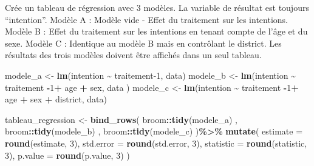 \documentclass[
]{article}
\newenvironment{Shaded}{\begin{snugshade}}{\end{snugshade}}
\newcommand{\AttributeTok}[1]{\textcolor[rgb]{0.13,0.29,0.53}{#1}}
\newcommand{\DecValTok}[1]{\textcolor[rgb]{0.00,0.00,0.81}{#1}}
\newcommand{\FunctionTok}[1]{\textcolor[rgb]{0.13,0.29,0.53}{\textbf{#1}}}
\newcommand{\NormalTok}[1]{#1}
\newcommand{\OtherTok}[1]{\textcolor[rgb]{0.56,0.35,0.01}{#1}}
\newcommand{\SpecialCharTok}[1]{\textcolor[rgb]{0.81,0.36,0.00}{\textbf{#1}}}
\begin{document}
\hfill\break
Crée un tableau de régression avec 3 modèles. La variable de résultat
est toujours ``intention''. Modèle A : Modèle vide - Effet du traitement
sur les intentions. Modèle B : Effet du traitement sur les intentions en
tenant compte de l'âge et du sexe. Modèle C : Identique au modèle B mais
en contrôlant le district. Les résultats des trois modèles doivent être
affichés dans un seul tableau.

\hfill\break

\begin{Shaded}
\begin{Highlighting}[]
\NormalTok{modele\_a }\OtherTok{\textless{}{-}} \FunctionTok{lm}\NormalTok{(intention }\SpecialCharTok{\textasciitilde{}}\NormalTok{ traitement}\DecValTok{{-}1}\NormalTok{, data)}
\NormalTok{modele\_b }\OtherTok{\textless{}{-}} \FunctionTok{lm}\NormalTok{(intention }\SpecialCharTok{\textasciitilde{}}\NormalTok{ traitement }\SpecialCharTok{{-}}\DecValTok{1}\SpecialCharTok{+}\NormalTok{ age }\SpecialCharTok{+}\NormalTok{ sex, data )}
\NormalTok{modele\_c }\OtherTok{\textless{}{-}} \FunctionTok{lm}\NormalTok{(intention }\SpecialCharTok{\textasciitilde{}}\NormalTok{ traitement }\SpecialCharTok{{-}}\DecValTok{1}\SpecialCharTok{+}\NormalTok{ age }\SpecialCharTok{+}\NormalTok{ sex }\SpecialCharTok{+}\NormalTok{ district, data)}

\NormalTok{tableau\_regression }\OtherTok{\textless{}{-}} \FunctionTok{bind\_rows}\NormalTok{(}
\NormalTok{  broom}\SpecialCharTok{::}\FunctionTok{tidy}\NormalTok{(modele\_a) ,}
\NormalTok{  broom}\SpecialCharTok{::}\FunctionTok{tidy}\NormalTok{(modele\_b) ,}
\NormalTok{  broom}\SpecialCharTok{::}\FunctionTok{tidy}\NormalTok{(modele\_c) }
\NormalTok{)}\SpecialCharTok{\%\textgreater{}\%}
  \FunctionTok{mutate}\NormalTok{(}
    \AttributeTok{estimate =} \FunctionTok{round}\NormalTok{(estimate, }\DecValTok{3}\NormalTok{),}
    \AttributeTok{std.error =} \FunctionTok{round}\NormalTok{(std.error, }\DecValTok{3}\NormalTok{),}
    \AttributeTok{statistic =} \FunctionTok{round}\NormalTok{(statistic, }\DecValTok{3}\NormalTok{),}
    \AttributeTok{p.value =} \FunctionTok{round}\NormalTok{(p.value, }\DecValTok{3}\NormalTok{)}
\NormalTok{  )}



\end{Highlighting}
\end{Shaded}
\end{document}
